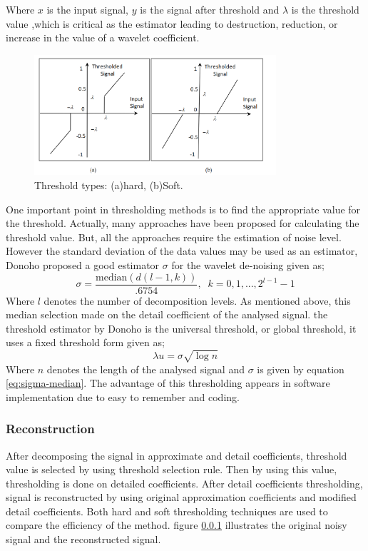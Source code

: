 \documentclass[12pt, a4paper, twoside]{report}
\begin{document}
Where $x$  is the input signal, $y$ is the signal after threshold and  $\lambda$ is the threshold value ,which is critical as the estimator leading to destruction, reduction, or increase in the value of a wavelet coefficient.

\begin{figure}[!h]
	\centering
	\includegraphics[width=0.8\textwidth]
	{images/chapter3/threshold-types}
	\caption{Threshold types: (a)hard, (b)Soft.}
	\label{fig:threshold-types}
\end{figure}

One important point in thresholding methods   is to find the appropriate value for the threshold. Actually, many approaches have   been proposed for calculating the threshold value. But, all the approaches require the estimation of   noise level. However the standard deviation of the data values may be used as an estimator, Donoho proposed a good estimator $\sigma$ for the wavelet de-noising given as;
\begin{equation}
\sigma = \frac{\text{median}(d (l-1,k))}{.6754}, \; \; k = 0, 1,...,2^{l-1} - 1
\label{eq:sigma-median}
\end{equation}
Where $l$ denotes the number of decomposition levels. As mentioned above, this median selection made on the detail coefficient of the analysed signal. 
the threshold estimator by Donoho is the  universal threshold, or global threshold, it uses a fixed threshold form given as;
\begin{equation*}
\lambda u = \sigma \sqrt{\log n}
\end{equation*}
Where $n$ denotes the length of the analysed signal and $\sigma$ is given by equation \ref{eq:sigma-median}. The advantage of this thresholding appears in software implementation due to easy to remember and coding.

\subsubsection{Reconstruction}
After  decomposing  the  signal  in approximate  and  detail  coefficients, threshold  value  is  selected  by  using threshold  selection  rule.  Then  by  using this  value,  thresholding  is  done  on detailed  coefficients.  After  detail coefficients  thresholding,  signal  is reconstructed  by  using  original approximation  coefficients  and  modified detail  coefficients.  Both hard and soft thresholding techniques are used   to compare the efficiency of the method. figure \ref{} illustrates the original noisy signal and the reconstructed signal.
\end{document}
